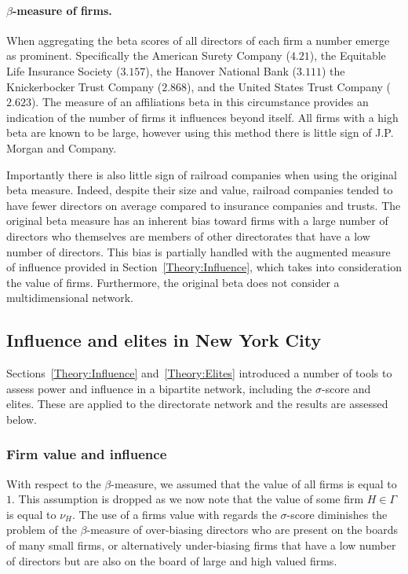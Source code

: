 \paragraph{$\beta$-measure of firms.}

When aggregating the beta scores of all directors of each firm a number emerge as prominent. Specifically the American Surety Company ($4.21$), the Equitable Life Insurance Society ($3.157$), the Hanover National Bank ($3.111$) the Knickerbocker Trust Company ($2.868$), and the United States Trust Company ($2.623$). The measure of an affiliations beta in this circumstance provides an indication of the number of firms it influences beyond itself. All firms with a high beta are known to be large, however using this method there is little sign of J.P. Morgan and Company.

Importantly there is also little sign of railroad companies when using the original beta measure. Indeed, despite their size and value, railroad companies tended to have fewer directors on average compared to insurance companies and trusts. The original beta measure has an inherent bias toward firms with a large number of directors who themselves are members of other directorates that have a low number of directors. This bias is partially handled with the augmented measure of influence provided in Section~\ref{Theory:Influence}, which takes into consideration the value of firms. Furthermore, the original beta does not consider a multidimensional network.

\subsection{Influence and elites in New York City}

Sections~\ref{Theory:Influence} and~\ref{Theory:Elites} introduced a number of tools to assess power and influence in a bipartite network, including the $\sigma$-score and elites. These are applied to the directorate network and the results are assessed below.

\subsubsection*{Firm value and influence}

With respect to the $\beta$-measure, we assumed that the value of all firms is equal to $1$. This assumption is dropped as we now note that the value of some firm $H \in \Gamma$ is equal to $\nu_{H}$. The use of a firms value with regards the $\sigma$-score diminishes the problem of the $\beta$-measure of over-biasing directors who are present on the boards of many small firms, or alternatively under-biasing firms that have a low number of directors but are also on the board of large and high valued firms.


